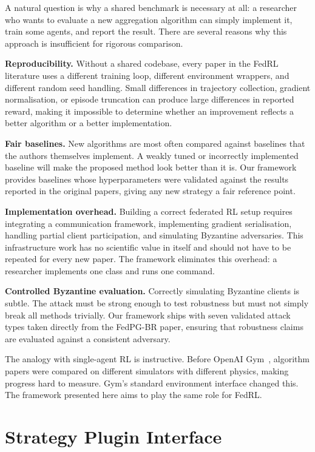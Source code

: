 \documentclass[a4paper, oneside]{discothesis}
\begin{document}
A natural question is why a shared benchmark is necessary at all: a researcher who wants to evaluate a new aggregation algorithm can simply implement it, train some agents, and report the result. There are several reasons why this approach is insufficient for rigorous comparison.

\textbf{Reproducibility.} Without a shared codebase, every paper in the FedRL literature uses a different training loop, different environment wrappers, and different random seed handling. Small differences in trajectory collection, gradient normalisation, or episode truncation can produce large differences in reported reward, making it impossible to determine whether an improvement reflects a better algorithm or a better implementation.

\textbf{Fair baselines.} New algorithms are most often compared against baselines that the authors themselves implement. A weakly tuned or incorrectly implemented baseline will make the proposed method look better than it is. Our framework provides baselines whose hyperparameters were validated against the results reported in the original papers, giving any new strategy a fair reference point.

\textbf{Implementation overhead.} Building a correct federated RL setup requires integrating a communication framework, implementing gradient serialisation, handling partial client participation, and simulating Byzantine adversaries. This infrastructure work has no scientific value in itself and should not have to be repeated for every new paper. The framework eliminates this overhead: a researcher implements one class and runs one command.

\textbf{Controlled Byzantine evaluation.} Correctly simulating Byzantine clients is subtle. The attack must be strong enough to test robustness but must not simply break all methods trivially. Our framework ships with seven validated attack types taken directly from the FedPG-BR paper, ensuring that robustness claims are evaluated against a consistent adversary.

The analogy with single-agent RL is instructive. Before OpenAI Gym~\cite{OpenAIGym}, algorithm papers were compared on different simulators with different physics, making progress hard to measure. Gym's standard environment interface changed this. The framework presented here aims to play the same role for FedRL.

\section{Strategy Plugin Interface}
\label{sec:bench:plugin}
\end{document}
